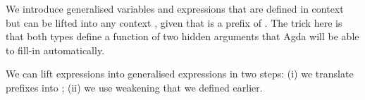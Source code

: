 We introduce generalised variables  and expressions  that
are defined in context  but can be lifted into any context , given
that  is a prefix of .  The trick here is that both types define
a function of two hidden arguments that Agda will be able to fill-in automatically.
We can lift expressions into generalised expressions in two steps: 
(i) we translate prefixes into ; (ii) we use weakening that we defined earlier.
